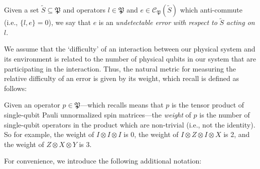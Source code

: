 \documentclass[twocolumn,showpacs,preprintnumbers,amsmath,amssymb,nofootinbib,pra,floatfix]{revtex4-1}
\newenvironment{definition}[1][Definition]{\begin{trivlist}
\item[\hskip \labelsep {\bfseries #1}]}{\end{trivlist}}
\newcommand{\set}{\tilde}
\newcommand{\pauligroup}{\mathfrak{P}}
\newcommand{\centralizer}{\mathcal{C}}
\begin{document}
\begin{definition}
Given a set $\set S\subseteq\pauligroup$ and operators $l\in\pauligroup$ and $e\in\centralizer_\pauligroup(\set S)$ which anti-commute (i.e., $\{l,e\}=0$), we say that $e$ is an \emph{undetectable error with respect to} $\set S$ \emph{acting on} $l$.
\end{definition}
We assume that the `difficulty' of an interaction between our physical system and its environment is related to the number of physical qubits in our system that are participating in the interaction.  Thus, the natural metric for measuring the relative difficulty of an error is given by its weight, which recall is defined as follows:

\begin{definition}
Given an operator $p\in\pauligroup$---which recalls means that $p$ is the tensor product of single-qubit Pauli unnormalized spin matrices---the \emph{weight} of $p$ is the number of single-qubit operators in the product which are non-trivial (i.e., not the identity).  So for example, the weight of $I\otimes I\otimes I$ is 0, the weight of $I\otimes Z\otimes I\otimes X$ is 2, and the weight of $Z\otimes X\otimes Y$ is 3.
\end{definition}
For convenience, we introduce the following additional notation:
\end{document}
